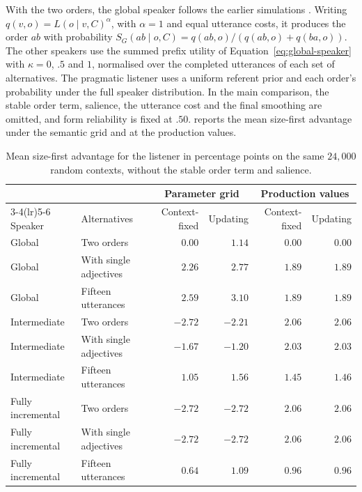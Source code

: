 \documentclass[10pt,a4paper,fleqn]{article}
\begin{document}
With the two orders, the global speaker follows the earlier simulations \citep{franke2019subjectivity}.
Writing $q(v,o)=L(o\mid v,C)^\alpha$, with $\alpha=1$ and equal utterance costs, it produces the order $ab$ with probability $S_G(ab\mid o,C)=q(ab,o)/(q(ab,o)+q(ba,o))$.
The other speakers use the summed prefix utility of Equation~\ref{eq:global-speaker} with $\kappa=0$, $.5$ and $1$, normalised over the completed utterances of each set of alternatives.
The pragmatic listener uses a uniform referent prior and each order's probability under the full speaker distribution.
In the main comparison, the stable order term, salience, the utterance cost and the final smoothing are omitted, and form reliability is fixed at $.50$.
 reports the mean size-first advantage under the semantic grid and at the production values.

\begin{table}[H]
  \centering
  \caption{Mean size-first advantage for the listener in percentage points on the same $24{,}000$ random contexts, without the stable order term and salience.}
  \label{tab:controlled-simulation-means}
  \footnotesize
  \begin{tabularx}{\textwidth}{lXrrrr}
    \toprule
    & & \multicolumn{2}{c}{Parameter grid} & \multicolumn{2}{c}{Production values} \\
    \cmidrule(lr){3-4}\cmidrule(lr){5-6}
    Speaker & Alternatives & Context-fixed & Updating & Context-fixed & Updating \\
    \midrule
    Global & Two orders & $0.00$ & $1.14$ & $0.00$ & $0.00$ \\
    Global & With single adjectives & $2.26$ & $2.77$ & $1.89$ & $1.89$ \\
    Global & Fifteen utterances & $2.59$ & $3.10$ & $1.89$ & $1.89$ \\
    \addlinespace
    Intermediate & Two orders & $-2.72$ & $-2.21$ & $2.06$ & $2.06$ \\
    Intermediate & With single adjectives & $-1.67$ & $-1.20$ & $2.03$ & $2.03$ \\
    Intermediate & Fifteen utterances & $1.05$ & $1.56$ & $1.45$ & $1.46$ \\
    \addlinespace
    Fully incremental & Two orders & $-2.72$ & $-2.72$ & $2.06$ & $2.06$ \\
    Fully incremental & With single adjectives & $-2.72$ & $-2.72$ & $2.06$ & $2.06$ \\
    Fully incremental & Fifteen utterances & $0.64$ & $1.09$ & $0.96$ & $0.96$ \\
    \bottomrule
  \end{tabularx}
\end{table}
\end{document}
